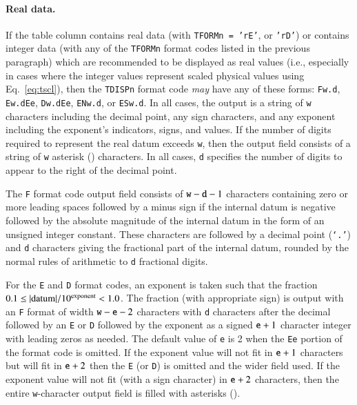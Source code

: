 \documentclass[onecolumn]{aa}
\begin{document}
 \paragraph{Real data.}  If the table column contains real data
 (with {\tt TFORMn = 'rE'}, or {\tt 'rD'}) or contains integer data
 (with any of the {\tt TFORMn} 
 format codes listed in the previous paragraph) which are recommended 
 to be displayed
 as real values (i.e., especially in cases where the
 integer values represent scaled physical values using Eq.~\ref{eq:tscl}), 
 then the {\tt TDISPn} format code {\em may} have any of these forms:
 {\tt F}{\tt w.d\/}, 
 {\tt E}{\tt w.d\/}{\tt E}{\tt e\/}, {\tt D}{\tt w.d\/}{\tt E}{\tt e\/},
 {\tt EN}{\tt w.d\/}, or {\tt ES}{\tt w.d\/}. In all cases, the output
 is a string of {\tt w} characters including the decimal point, any sign
 characters, and any exponent including the exponent's indicators,
 signs, and values.  If the number of digits required to represent the
 real datum exceeds {\tt w}, then the output field consists of a string of
 {\tt w} asterisk ({\tt *}) characters.  In all cases, {\tt d} specifies the
 number of digits to appear to the right of the decimal point.  
 
 The
 {\tt F} format code output field consists of ${\tt w} - {\tt d} - 1$ characters
 containing zero or more leading spaces followed by a minus sign if the
 internal datum is negative followed by the absolute magnitude of the
 internal datum in the form of an unsigned integer constant.  These
 characters are followed by a decimal point ({\tt `.'}) and {\tt d}
 characters giving the fractional part of the internal datum, rounded
 by the normal rules of arithmetic to {\tt d} fractional digits.  
 
 For the {\tt E} and {\tt D} format codes, an exponent is taken such that the
 fraction $0.1 \le |{\rm datum}| / 10^{\rm exponent} < 1.0$.  The fraction (with
 appropriate sign) is output with an {\tt F} format of width 
 $ {\tt w} - {\tt e} - 2$
 characters with {\tt d} characters after the decimal followed by an {\tt E}
 or {\tt D} followed by the exponent as a signed ${\tt e} + 1$ character 
 integer
 with leading zeros as needed.  The default value of {\tt e} is 2 
 when the {\tt E}{\tt e} portion of the format code is omitted.  If
 the exponent value will not fit in ${\tt e} + 1$ characters but will fit in
 ${\tt e} + 2$ then the {\tt E} (or {\tt D}) is omitted and the wider field
 used.  If the exponent value will not fit (with a sign character) in
 ${\tt e} + 2$ characters, then the entire {\tt w}-character output field is 
 filled
 with asterisks ({\tt *}).  
 
\end{document}
